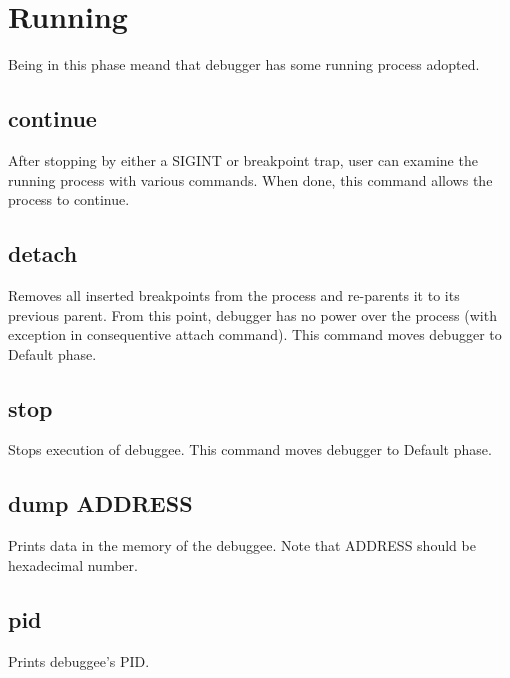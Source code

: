 \documentclass{article}
\begin{document}
	\pagebreak   
	\section{Running}
	Being in this phase meand that debugger has some running process adopted. 
	
	\subsection{continue}
	After stopping by either a SIGINT or breakpoint trap, user can examine the running process with various commands. When done, this command allows the process to continue.
		
	\subsection{detach}
	Removes all inserted breakpoints from the process and re-parents it to its previous parent. From this point, debugger has no power over the process (with exception in consequentive attach command). This command moves debugger to Default phase.
	
	\subsection{stop}
	Stops execution of debuggee. This command moves debugger to Default phase.	
	
	\subsection{dump ADDRESS}
	Prints data in the memory of the debuggee. Note that ADDRESS should be hexadecimal number.	
	
	\subsection{pid}
	Prints debuggee's PID.	
	
\end{document}
